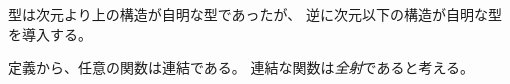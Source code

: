 \documentclass[index]{subfiles}
\begin{document}

型は次元より上の構造が自明な型であったが、
逆に次元以下の構造が自明な型を導入する。






定義から、任意の関数は\myInlineMath{\myTLMinusTwo}連結である。
\myInlineMath{\myTLMinusOne}連結な関数は\emph{全射}であると考える。



\end{document}
